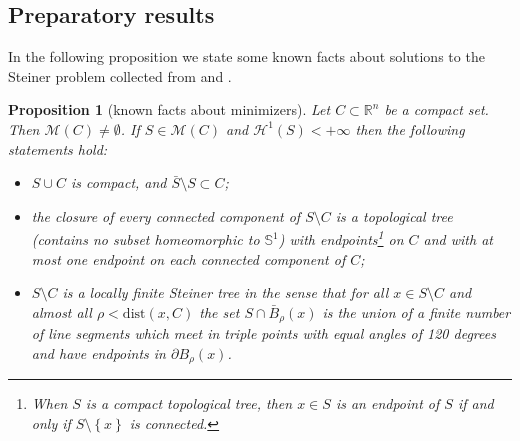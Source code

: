\documentclass{amsart}
\newcommand{\RR}{\mathbb R}
\renewcommand{\H}{\mathcal H}
\newcommand{\ENCLOSE}[1]{\left\{#1\right\}}
\newcommand{\M}{\mathcal{M}}
\renewcommand{\H}{\mathcal{H}}
\newcommand{\dist}{\mathrm{dist}}
\newtheorem{proposition}[theorem]{Proposition}
\newtheorem{conjecture}[theorem]{Conjecture}
\theoremstyle{definition}
\theoremstyle{remark}
\begin{document}
% 
% 

\subsection{Preparatory results}

In the following proposition we state some known facts about 
solutions to the Steiner problem collected from \cite{PaoSte12}
and \cite{IvaTuz94}.

\begin{proposition}[known facts about minimizers]\label{prop:PaoSte}
  Let $C\subset \RR^n$ be a compact set.
  Then $\M(C)\neq \emptyset$. If $S\in \M(C)$
  and $\H^1(S)<+\infty$
  then the following statements hold:
  \begin{itemize}
    \item[(i)] $S\cup C$ is compact, 
    and $\bar S \setminus S \subset C$;
    \item[(ii)] the closure of every connected component of $S\setminus C$     
    is a topological tree 
    (contains no subset homeomorphic to $\mathbb S^1$)
    with endpoints\footnote{%
    When $S$ is a compact topological tree, then $x\in S$ is an endpoint 
    of $S$ if and only if $S\setminus \ENCLOSE{x}$ is connected.} 
    on $C$ and with at most one endpoint 
    on each connected component of $C$;
    \item[(iii)] $S\setminus C$ is a locally finite Steiner tree in the sense that 
    for all $x\in S\setminus C$ and almost all 
    $\rho < \dist(x,C)$ the set $S\cap \bar B_\rho(x)$ 
    is the union of a finite number of line 
    segments which meet in triple points with equal 
    angles of 120 degrees and have endpoints in 
    $\partial B_\rho(x)$.

  \end{itemize}
\end{proposition}
\end{document}
